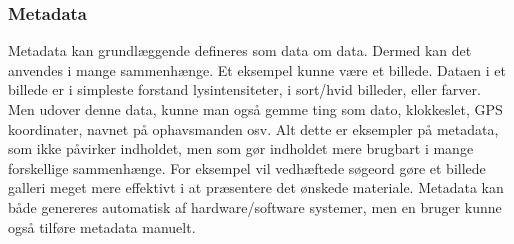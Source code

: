 \subsubsection{Metadata}
Metadata kan grundlæggende defineres som data om data. Dermed kan det anvendes i mange sammenhænge. Et eksempel kunne være et billede. Dataen i et billede er i simpleste forstand lysintensiteter, i sort/hvid billeder, eller farver. Men udover denne data, kunne man også gemme ting som dato, klokkeslet, GPS koordinater, navnet på ophavsmanden osv. Alt dette er eksempler på metadata, som ikke påvirker indholdet, men som gør indholdet mere brugbart i mange forskellige sammenhænge. For eksempel vil vedhæftede søgeord gøre et billede galleri meget mere effektivt i at præsentere det ønskede materiale. Metadata kan både genereres automatisk af hardware/software systemer, men en bruger kunne også tilføre metadata manuelt.

